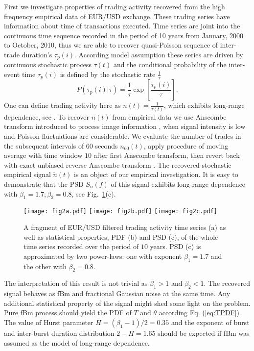 \documentclass{article}
\newcommand\figref[1]{Fig.~\ref{#1}}
\begin{document}
First we investigate properties of trading activity recovered from the high frequency empirical data of EUR/USD exchange. These trading series have information about time of transactions executed. Time series are joint into the continuous time sequence recorded in the period of 10 years from January, 2000 to October, 2010, thus we are able to recover quasi-Poisson sequence of inter-trade duration's $\tau_p(i)$. According model assumption \cite{Gontis2007PhysA} these series are driven by continuous stochastic process $\tau(t)$ and the conditional probability of the inter-event time $\tau_p(i)$ is defined by 
the stochastic rate $\frac{1}{\tau}$ 
\begin{equation}
P(\tau_p(i)\vert \tau) = \frac{1}{\tau} \exp \left[ \frac{\tau_p(i)}{\tau} \right].
\label{eq:Poisson}
\end{equation}
One can define trading activity here as $n(t)=\frac{1}{\tau(t)}$, which exhibits long-range dependence, see \cite{Gontis2006JStatMech,Gontis2007PhysA,Gontis2008PhysA}. To recover $n(t)$ from empirical data we use Anscombe transform introduced to process image information \cite{Makitalo2013IEEE}, when signal intensity is low and Poisson fluctuations are considerable.  We evaluate the number of trades in the subsequent intervals of 60 seconds $n_{60}(t)$, apply procedure of moving average with time window $10$ after first Anscombe transform, then revert back with exact unbiased reverse Anscombe transform \cite{Makitalo2013IEEE}.  
The recovered stochastic empirical signal $\tilde{n}(t)$ is an object of our empirical investigation. It is easy to demonstrate that the PSD $S_n(f)$ of this signal exhibits long-range dependence with $\beta_1=1.7; \beta_2=0.8$, see \figref{fig2}(c).

\begin{figure}[h]
\centering
\texttt{[image: fig2a.pdf]}
\texttt{[image: fig2b.pdf]}
\texttt{[image: fig2c.pdf]}
\caption{\label{fig2} A fragment of EUR/USD filtered trading activity time series (a) as well as statistical properties, PDF (b) and PSD (c), of the whole time series recorded over the period of $10$ years. PSD (c) is approximated by two power-laws: one with exponent $\beta_1=1.7$ and the other with $\beta_2=0.8$.}
\end{figure}

The interpretation of this result is not trivial as $\beta_1 > 1$ and $\beta_2 < 1$. The recovered signal behaves as fBm and fractional Gaussian noise at the same time. Any additional statistical property of the signal might shed some light on the problem.  Pure fBm process should yield the PDF of  $T$ and $\theta$ according Eq. (\ref{eq:TPDF}). The value of Hurst parameter $H=(\beta_1-1)/2=0.35$ and the exponent of burst and inter-burst duration distribution $2-H=1.65$ should be expected if fBm was assumed as the model of long-range dependence. 
\end{document}
